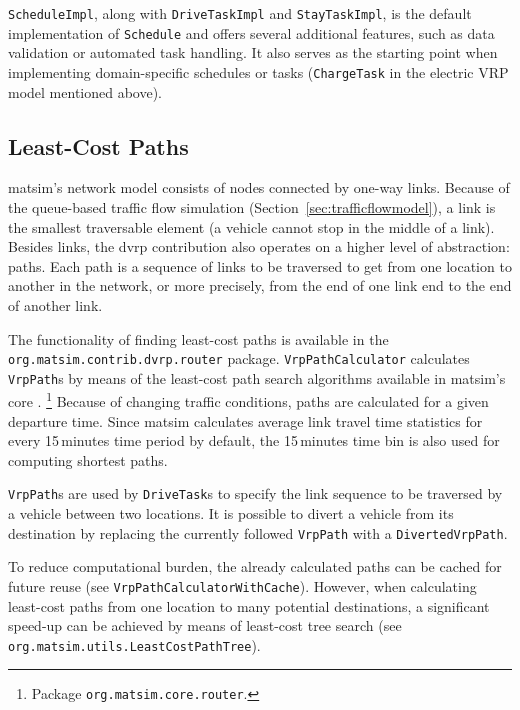 \lstinline$ScheduleImpl$, along with \lstinline$DriveTaskImpl$ and \lstinline$StayTaskImpl$, is the default implementation of \lstinline$Schedule$ and offers several additional features, such as data validation or automated task handling. It also serves as the starting point when implementing domain-specific schedules or tasks (\eg \lstinline$ChargeTask$ in the electric VRP model mentioned above).

\subsection{Least-Cost Paths}
\label{sec:VRP-router}

\gls{matsim}'s network model consists of nodes connected by one-way links. Because of the queue-based traffic flow simulation (Section~\ref{sec:trafficflowmodel}), a link is the smallest traversable element (\ie a vehicle cannot stop in the middle of a link). Besides links, the \gls{dvrp} contribution also operates on a higher level of abstraction: paths. Each path is a sequence of links to be traversed to get from one location to another in the network, or more precisely, from the end of one link end to the end of another link. 

The functionality of finding least-cost paths is available in the \lstinline$org.matsim.contrib.dvrp.router$ package. \lstinline$VrpPathCalculator$ calculates \lstinline$VrpPath$s by means of the least-cost path search algorithms available in \gls{matsim}'s core
\citep{JacobMaratheEtAl1999computationalstudyof,LefebvreBalmer_unpub_STRC_2007}.%
\footnote{
Package \lstinline$org.matsim.core.router$.
}
Because of changing traffic conditions, paths are calculated for a given departure time. Since \gls{matsim} calculates average link travel time statistics for every 15\,minutes time period by default, the 15\,minutes time bin is also used for computing shortest paths.

\lstinline$VrpPath$s are used by \lstinline$DriveTask$s to specify the link sequence to be traversed by a vehicle between two locations. It is possible to divert a vehicle from its destination by replacing the currently followed \lstinline$VrpPath$ with a \lstinline$DivertedVrpPath$.

To reduce computational burden, the already calculated paths can be cached for future reuse (see \lstinline$VrpPathCalculatorWithCache$). However, when calculating least-cost paths from one location to many potential destinations, a significant speed-up can be achieved by means of least-cost tree search (see \lstinline$org.matsim.utils.LeastCostPathTree$).

